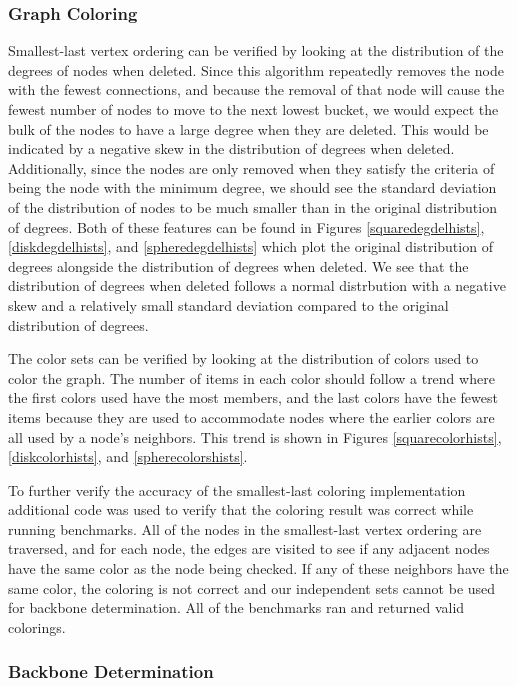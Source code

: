 \documentclass{article}
\begin{document}
        \subsubsection{Graph Coloring}
        Smallest-last vertex ordering can be verified by looking at the distribution of the degrees of nodes when deleted. Since this algorithm repeatedly removes the node with the fewest connections, and because the removal of that node will cause the fewest number of nodes to move to the next lowest bucket, we would expect the bulk of the nodes to have a large degree when they are deleted. This would be indicated by a negative skew in the distribution of degrees when deleted. Additionally, since the nodes are only removed when they satisfy the criteria of being the node with the minimum degree, we should see the standard deviation of the distribution of nodes to be much smaller than in the original distribution of degrees. Both of these features can be found in Figures \ref{squaredegdelhists}, \ref{diskdegdelhists}, and \ref{spheredegdelhists} which plot the original distribution of degrees alongside the distribution of degrees when deleted. We see that the distribution of degrees when deleted follows a normal distrbution with a negative skew and a relatively small standard deviation compared to the original distribution of degrees.
        \par
        The color sets can be verified by looking at the distribution of colors used to color the graph. The number of items in each color should follow a trend where the first colors used have the most members, and the last colors have the fewest items because they are used to accommodate nodes where the earlier colors are all used by a node's neighbors. This trend is shown in Figures \ref{squarecolorhists}, \ref{diskcolorhists}, and \ref{spherecolorshists}.
        \par
        To further verify the accuracy of the smallest-last coloring implementation additional code was used to verify that the coloring result was correct while running benchmarks. All of the nodes in the smallest-last vertex ordering are traversed, and for each node, the edges are visited to see if any adjacent nodes have the same color as the node being checked. If any of these neighbors have the same color, the coloring is not correct and our independent sets cannot be used for backbone determination. All of the benchmarks ran and returned valid colorings.

        \subsubsection{Backbone Determination}
\end{document}
